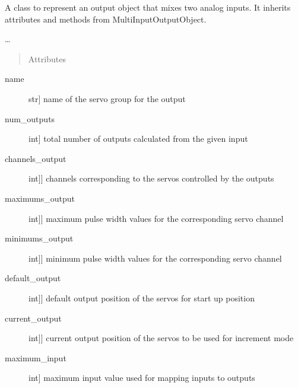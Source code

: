 \documentclass[letterpaper,10pt,english]{sphinxmanual}
\begin{document}
\begin{fulllineitems}
\label{\detokenize{generic:AnalogMixerOutput.AnalogMixerOutput}}
\sphinxAtStartPar
A class to represent an output object that mixes two analog inputs.
It inherits attributes and methods from MultiInputOutputObject.

\sphinxAtStartPar
…
\begin{quote}\begin{description}
\item[{Attributes}] \leavevmode
\end{description}\end{quote}
\begin{description}
\item[{name}] \leavevmode{[}str{]}
\sphinxAtStartPar
name of the servo group for the output

\item[{num\_outputs}] \leavevmode{[}int{]}
\sphinxAtStartPar
total number of outputs calculated from the given input

\item[{channels\_output}] \leavevmode{[}{[}int{]}{]}
\sphinxAtStartPar
channels corresponding to the servos controlled by the outputs

\item[{maximums\_output}] \leavevmode{[}{[}int{]}{]}
\sphinxAtStartPar
maximum pulse width values for the corresponding servo channel

\item[{minimums\_output}] \leavevmode{[}{[}int{]}{]}
\sphinxAtStartPar
minimum pulse width values for the corresponding servo channel

\item[{default\_output}] \leavevmode{[}{[}int{]}{]}
\sphinxAtStartPar
default output position of the servos for start up position

\item[{current\_output}] \leavevmode{[}{[}int{]}{]}
\sphinxAtStartPar
current output position of the servos to be used for increment mode

\item[{maximum\_input}] \leavevmode{[}int{]}
\sphinxAtStartPar
maximum input value used for mapping inputs to outputs


\end{description}
\end{fulllineitems}
\end{document}
